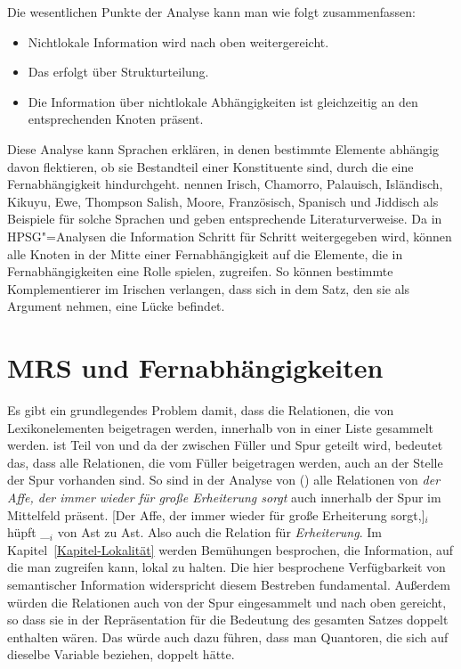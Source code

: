 Die wesentlichen Punkte der Analyse kann man wie folgt zusammenfassen:
\begin{itemize}
\item Nichtlokale Information wird nach oben weitergereicht.
\item Das erfolgt über Strukturteilung.
\item Die Information über nichtlokale Abhängigkeiten ist gleichzeitig an den entsprechenden Knoten präsent.
\end{itemize}
Diese Analyse kann Sprachen erklären, in denen bestimmte Elemente abhängig davon flektieren,
ob sie Bestandteil einer Konstituente sind, durch die eine Fernabhängigkeit hindurchgeht. \citet*{BMS2001a} nennen 
Irisch, Chamorro, Palauisch, Isländisch,
Kikuyu, Ewe, Thompson Salish, Moore, 
Französisch, Spanisch und Jiddisch als Beispiele für
solche Sprachen und geben entsprechende Literaturverweise. Da in HPSG"=Analysen die Information Schritt für Schritt
weitergegeben wird, können alle Knoten in der Mitte einer Fernabhängigkeit auf die Elemente, die in
Fernabhängigkeiten eine Rolle spielen, zugreifen. So können \zB bestimmte Komplementierer im
Irischen verlangen, dass sich in dem Satz, den sie als Argument nehmen, eine Lücke befindet.

\section{MRS und Fernabhängigkeiten}
\label{Abschnitt MRS und Fernabhängigkeiten}

Es gibt ein grundlegendes Problem damit, dass die Relationen, die von Lexikonelementen beigetragen
werden, innerhalb von \cont in einer Liste gesammelt werden. \cont ist Teil von \local und da der
\localw zwischen Füller und Spur geteilt wird, bedeutet das, dass alle Relationen, die vom Füller
beigetragen werden, auch an der Stelle der Spur vorhanden sind. So sind in der Analyse von ()
alle Relationen von \emph{der Affe, der immer wieder für große Erheiterung sorgt} auch innerhalb der
Spur im Mittelfeld präsent.
\ea
{}[Der Affe, der immer wieder für große Erheiterung sorgt,]$_i$ hüpft \_$_i$ von Ast zu Ast.
\z
Also auch die Relation für \emph{Erheiterung}. Im Kapitel~\ref{Kapitel-Lokalität} werden Bemühungen
besprochen, die Information, auf die man zugreifen kann, lokal zu halten. Die hier besprochene
Verfügbarkeit von semantischer Information widerspricht diesem Bestreben fundamental. Außerdem
würden die Relationen auch von der Spur eingesammelt und nach oben gereicht, so dass sie in der
Repräsentation für die Bedeutung des gesamten Satzes doppelt enthalten wären. Das würde auch dazu führen,
dass man Quantoren, die sich auf dieselbe Variable beziehen, doppelt hätte.

